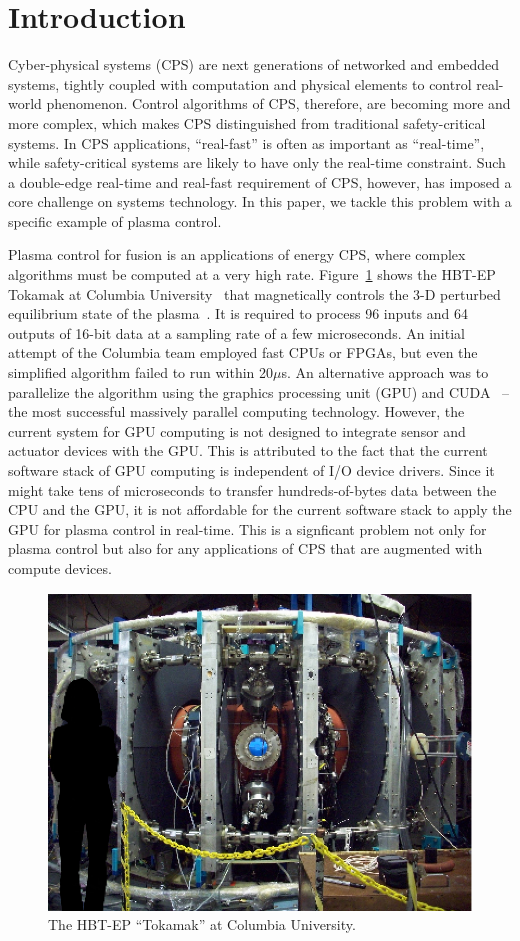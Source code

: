 \section{Introduction}
\label{sec:introduction}

Cyber-physical systems (CPS) are next generations of networked and
embedded systems, tightly coupled with computation and physical
elements to control real-world phenomenon.
Control algorithms of CPS, therefore, are becoming more and more
complex, which makes CPS distinguished from traditional safety-critical
systems.
In CPS applications, ``real-fast'' is often as important as ``real-time'',
while safety-critical systems are likely to have only the real-time
constraint. 
Such a double-edge real-time and real-fast requirement of CPS, however,
has imposed a core challenge on systems technology.
In this paper, we tackle this problem with a specific example of plasma
control.

Plasma control for fusion is an applications of energy CPS, where
complex algorithms must be computed at a very high rate.
Figure~\ref{fig:tokamak} shows the HBT-EP Tokamak at Columbia
University~\cite{Maurer_PPCF11,Rath_FED12} that magnetically controls
the 3-D perturbed equilibrium state of the plasma~\cite{Boozer_PP99}.
It is required to process 96 inputs and 64 outputs of 16-bit data at a
sampling rate of a few microseconds.
An initial attempt of the Columbia team employed fast CPUs or FPGAs, but
even the simplified algorithm failed to run within 20$\mu$s.
An alternative approach was to parallelize the algorithm using the
graphics processing unit (GPU) and CUDA~\cite{CUDA} -- the most
successful massively parallel computing technology.
However, the current system for GPU computing is not designed to
integrate sensor and actuator devices with the GPU.
This is attributed to the fact that the current software stack
of GPU computing is independent of I/O device drivers.
Since it might take tens of microseconds to transfer hundreds-of-bytes
data between the CPU and the GPU, it is not affordable for the current
software stack to apply the GPU for plasma control in real-time.
This is a signficant problem not only for plasma control but also for
any applications of CPS that are augmented with compute devices.

\begin{figure}[t]
 \centering
 \includegraphics[width=0.78\hsize]{eps/tokamak.eps}
 \caption{The HBT-EP ``Tokamak'' at Columbia University.}
 \label{fig:tokamak}
\end{figure}

